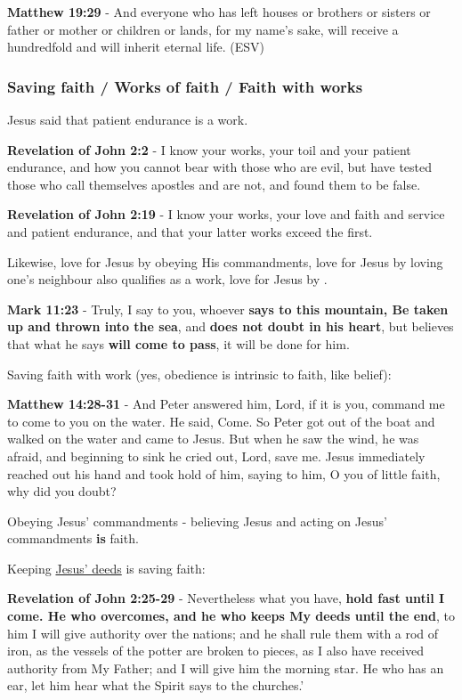 \documentclass[11pt]{article}
\begin{document}
\textbf{Matthew 19:29} - And everyone who has left houses or brothers or sisters or father or mother or children or lands, for my name's sake, will receive a hundredfold and will inherit eternal life. (ESV)

\subsubsection{Saving faith / Works of faith / Faith with works}
\label{sec:org77f6ef0}
Jesus said that patient endurance is a work.

\textbf{Revelation of John 2:2} - I know your works, your toil and your patient endurance, and how you cannot bear with those who are evil, but have tested those who call themselves apostles and are not, and found them to be false.

\textbf{Revelation of John 2:19} - I know your works, your love and faith and service and patient endurance, and that your latter works exceed the first.

Likewise, love for Jesus by obeying His commandments, love for Jesus by loving one's neighbour also qualifies as a work, love for Jesus by .

\textbf{Mark 11:23} - Truly, I say to you, whoever \textbf{says to this mountain, Be taken up and thrown into the sea}, and \textbf{does not doubt in his heart}, but believes that what he says \textbf{will come to pass}, it will be done for him.

Saving faith with work (yes, obedience is intrinsic to faith, like belief):

\textbf{Matthew 14:28-31} - And Peter answered him, Lord, if it is you, command me to come to you on the water. He said, Come. So Peter got out of the boat and walked on the water and came to Jesus. But when he saw the wind, he was afraid, and beginning to sink he cried out, Lord, save me. Jesus immediately reached out his hand and took hold of him, saying to him, O you of little faith, why did you doubt?

Obeying Jesus' commandments - believing Jesus and acting on Jesus' commandments \textbf{is} faith.

Keeping \uline{Jesus' deeds} is saving faith:

\textbf{Revelation of John 2:25-29} - Nevertheless what you have, \textbf{hold fast until I come. He who overcomes, and he who keeps My deeds until the end}, to him I will give authority over the nations; and he shall rule them with a rod of iron, as the vessels of the potter are broken to pieces, as I also have received authority from My Father; and I will give him the morning star. He who has an ear, let him hear what the Spirit says to the churches.’
\end{document}
